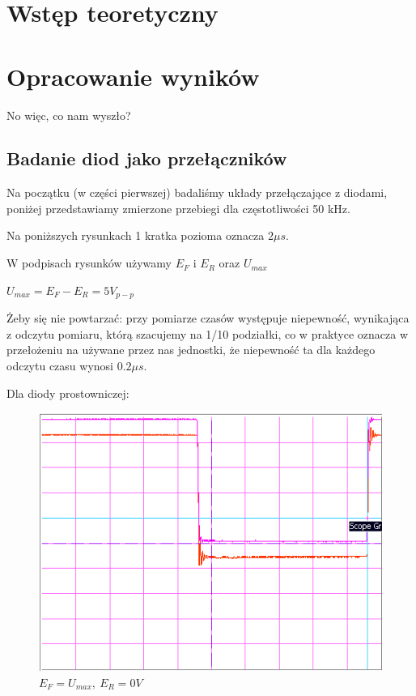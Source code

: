 \documentclass[a4paper,11pt]{article}
\begin{document}
\section{Wstęp teoretyczny}


\section{Opracowanie wyników}
No więc, co nam wyszło?

\subsection{Badanie diod jako przełączników}
Na początku (w części pierwszej) badaliśmy układy przełączające z diodami, poniżej przedstawiamy zmierzone przebiegi dla częstotliwości 50 kHz.

Na poniższych rysunkach 1 kratka pozioma oznacza \(2 \mu s\).

W podpisach rysunków używamy \(E_F \) i \(E_R \) oraz \(U_{max} \)

\(U_{max} = E_F - E_R = 5V_{p-p}\)


Żeby się nie powtarzać: przy pomiarze czasów występuje niepewność, wynikająca z odczytu pomiaru, którą szacujemy na 1/10 podziałki, co w praktyce oznacza w przełożeniu na używane przez nas jednostki, że niepewność ta dla każdego odczytu czasu wynosi \(0.2 \mu s\).

Dla diody prostowniczej:

\begin{figure} [H]
  \begin{center}
    \includegraphics{../Obrazki_i_tekst/obrobione/1asciety.png}
    \caption{\( E_F = U_{max}, \ E_R = 0V \)}
  \end{center}
\end{figure}
\end{document}
